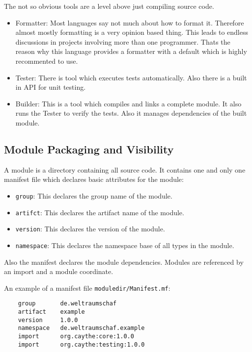 \documentclass[a4paper,12pt]{article}
\begin{document}
The not so obvious tools are a level above just compiling source code.

\begin{itemize}
    \item Formatter: Most languages say not much about how to format it. Therefore almost mostly formatting is a very opinion based thing. This leads to endless discussions in projects involving more than one programmer. Thats the reason why this language provides a formatter with a default which is highly recommented to use.
    \item Tester: There is tool which executes tests automatically. Also there is a built in API for unit testing.
    \item Builder: This is a tool which compiles and links a complete module. It also runs the Tester to verify the tests. Also it manages dependencies of the built module.
\end{itemize}

\subsection{Module Packaging and Visibility}

A module is a directory containing all source code. It contains one and only one manifest file which declares basic attributes for the module:

\begin{itemize}
    \item \verb|group|: This declares the group name of the module.
    \item \verb|artifct|: This declares the artifact name of the module.
    \item \verb|version|: This declares the version of the module.
    \item \verb|namespace|: This declares the namespace base of all types in the module.
\end{itemize}

Also the manifest declares the module dependencies. Modules are referenced by an import and a module coordinate.

An example of a manifest file \verb|moduledir/Manifest.mf|:
\begin{verbatim}
    group       de.weltraumschaf
    artifact    example
    version     1.0.0
    namespace   de.weltraumschaf.example
    import      org.caythe:core:1.0.0
    import      org.caythe:testing:1.0.0
\end{verbatim}
\end{document}
